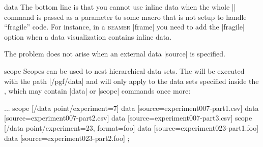 \begin{datavisualizationoperation}{data}{}
  The bottom line is that you cannot use inline data when the whole
  |\datavisualization| command is passed as a parameter to some
  macro that is not setup to handle ``fragile'' code. For instance, in
  a \textsc{beamer} |frame| you need to add the |fragile| option when
  a data visualization contains inline data.

  The problem does not arise when an external data |source| is
  specified.
\end{datavisualizationoperation}



\begin{datavisualizationoperation}{scope}{}
  Scopes can be used to nest hierarchical data sets. The
   will be executed with the path |/pgf/data| and will
  only apply to the data sets specified inside the , which may contain |data| or |scope| commands once more:
\begin{codeexample}
\datavisualization...
  scope [/data point/experiment=7]
  {
    data [source=experiment007-part1.csv]
    data [source=experiment007-part2.csv]
    data [source=experiment007-part3.csv]
  }
  scope [/data point/experiment=23, format=foo]
  {
    data [source=experiment023-part1.foo]
    data [source=experiment023-part2.foo]
  };
\end{codeexample}
\end{datavisualizationoperation}


